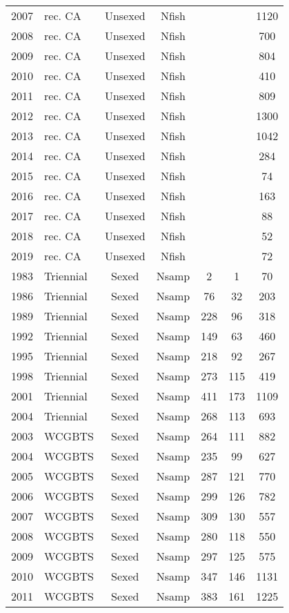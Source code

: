\begin{longtable}[t]{c>{\centering\arraybackslash}p{3cm}ccccc}
2007 & rec. CA & Unsexed & Nfish &  &  & 1120\\
2008 & rec. CA & Unsexed & Nfish &  &  & 700\\
2009 & rec. CA & Unsexed & Nfish &  &  & 804\\
2010 & rec. CA & Unsexed & Nfish &  &  & 410\\
2011 & rec. CA & Unsexed & Nfish &  &  & 809\\
2012 & rec. CA & Unsexed & Nfish &  &  & 1300\\
2013 & rec. CA & Unsexed & Nfish &  &  & 1042\\
2014 & rec. CA & Unsexed & Nfish &  &  & 284\\
2015 & rec. CA & Unsexed & Nfish &  &  & 74\\
2016 & rec. CA & Unsexed & Nfish &  &  & 163\\
2017 & rec. CA & Unsexed & Nfish &  &  & 88\\
2018 & rec. CA & Unsexed & Nfish &  &  & 52\\
2019 & rec. CA & Unsexed & Nfish &  &  & 72\\
1983 & Triennial & Sexed & Nsamp & 2 & 1 & 70\\
1986 & Triennial & Sexed & Nsamp & 76 & 32 & 203\\
1989 & Triennial & Sexed & Nsamp & 228 & 96 & 318\\
1992 & Triennial & Sexed & Nsamp & 149 & 63 & 460\\
1995 & Triennial & Sexed & Nsamp & 218 & 92 & 267\\
1998 & Triennial & Sexed & Nsamp & 273 & 115 & 419\\
2001 & Triennial & Sexed & Nsamp & 411 & 173 & 1109\\
2004 & Triennial & Sexed & Nsamp & 268 & 113 & 693\\
2003 & WCGBTS & Sexed & Nsamp & 264 & 111 & 882\\
2004 & WCGBTS & Sexed & Nsamp & 235 & 99 & 627\\
2005 & WCGBTS & Sexed & Nsamp & 287 & 121 & 770\\
2006 & WCGBTS & Sexed & Nsamp & 299 & 126 & 782\\
2007 & WCGBTS & Sexed & Nsamp & 309 & 130 & 557\\
2008 & WCGBTS & Sexed & Nsamp & 280 & 118 & 550\\
2009 & WCGBTS & Sexed & Nsamp & 297 & 125 & 575\\
2010 & WCGBTS & Sexed & Nsamp & 347 & 146 & 1131\\
2011 & WCGBTS & Sexed & Nsamp & 383 & 161 & 1225\\

\end{longtable}

